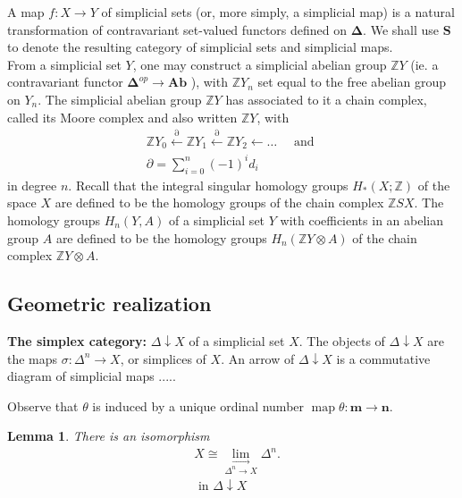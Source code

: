 \documentclass{book}
\newtheorem{lemm}{Lemma}
\begin{document}
A map $f: X \rightarrow Y$ of simplicial sets (or, more simply, a simplicial map) is a natural transformation of contravariant set-valued functors defined on $\boldsymbol{\Delta}$. We shall use $\mathbf{S}$ to denote the resulting category of simplicial sets and simplicial maps.\\

From a simplicial set $Y$, one may construct a simplicial abelian group $\mathbb{Z} Y$ (ie. a contravariant functor $\boldsymbol{\Delta}^{o p} \rightarrow \mathbf{A b}$ ), with $\mathbb{Z} Y_n$ set equal to the free abelian group on $Y_n$. The simplicial abelian group $\mathbb{Z} Y$ has associated to it a chain complex, called its Moore complex and also written $\mathbb{Z} Y$, with
$$
\begin{gathered}
\mathbb{Z} Y_0 \stackrel{\partial}{\leftarrow} \mathbb{Z} Y_1 \stackrel{\partial}{\leftarrow} \mathbb{Z} Y_2 \leftarrow \ldots \quad \text { and } \\
\partial=\sum_{i=0}^n(-1)^i d_i
\end{gathered}
$$
in degree $n$. Recall that the integral singular homology groups $H_*(X ; \mathbb{Z})$ of the space $X$ are defined to be the homology groups of the chain complex $\mathbb{Z} S X$. The homology groups $H_n(Y, A)$ of a simplicial set $Y$ with coefficients in an abelian group $A$ are defined to be the homology groups $H_n(\mathbb{Z} Y \otimes A)$ of the chain complex $\mathbb{Z} Y \otimes A$.



\subsection*{Geometric realization}

\textbf{The simplex category:} $\Delta \downarrow X$ of a simplicial set $X$. The objects of $\Delta \downarrow X$ are the maps $\sigma: \Delta^n \rightarrow X$, or simplices of $X$. An arrow of $\Delta \downarrow X$ is a commutative diagram of simplicial maps .....

Observe that $\theta$ is induced by a unique ordinal number $\operatorname{map} \theta: \mathbf{m} \rightarrow \mathbf{n}$.
\begin{lemm} There is an isomorphism
$$
\begin{aligned}
& X \cong \underset{\Delta^n \longrightarrow X}{\lim _{\longrightarrow}} \Delta^n . \\
& \text { in } \Delta \downarrow X \\
&
\end{aligned}
$$
\end{lemm}
\end{document}
